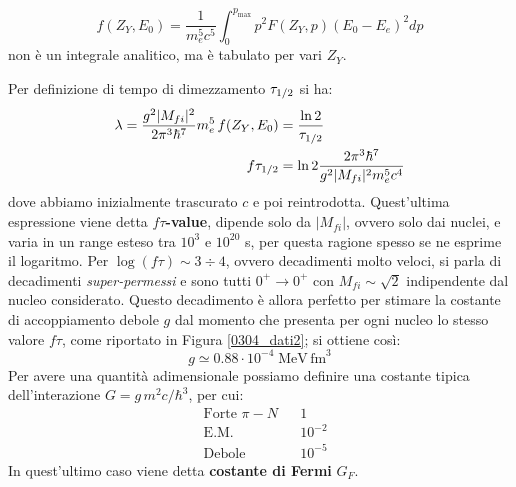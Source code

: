 \begin{definition}
$$f(Z_Y,E_0) = \frac{1}{m_e^5 c^5}\int_0^{p_{\max{}}} p^2 F(Z_Y,p)(E_0-E_e)^2 dp$$
non è un integrale analitico, ma è tabulato per vari $Z_Y$.
\end{definition}
\noindent Per definizione di tempo di dimezzamento $\tau_{1/2}$ si ha:
\begin{displaymath}
\begin{aligned}
\lambda = \frac{g^2 |M_{fi}|^2}{2\pi^3 \hbar^7} m_e^5\, f(Z_Y,E_0) &= \frac{\ln{2}}{\tau_{1/2}} \\
f\tau_{1/2} &= \ln{2}\frac{2\pi^3 \hbar^7}{ g^2 |M_{fi}|^2 m_e^5 c^4} 
\end{aligned}
\end{displaymath}
dove abbiamo inizialmente trascurato $c$ e poi reintrodotta. Quest'ultima espressione viene detta $f\tau$\textbf{-value}, dipende solo da $|M_{fi}|$, ovvero solo dai nuclei, e varia in un range esteso tra $10^3$ e $10^{20}$ s, per questa ragione spesso se ne esprime il logaritmo. Per $\log{(f\tau)}\sim 3 \div 4$, ovvero decadimenti molto veloci, si parla di decadimenti \textit{super-permessi} e sono tutti $0^+\to0^+$ con $M_{fi}\sim \sqrt{2}$ indipendente dal nucleo considerato. Questo decadimento è allora perfetto per stimare la costante di accoppiamento debole $g$ dal momento che presenta per ogni nucleo lo stesso valore $f\tau$, come riportato in Figura \ref{0304_dati2}; si ottiene così:
$$g\simeq 0.88\cdot 10^{-4} \;\mbox{MeV}\,\mbox{fm}^3$$
Per avere una quantità adimensionale possiamo definire una costante tipica dell'interazione $G = g \,m^2c/\hbar^3$, per cui:
\begin{displaymath}
\begin{aligned}
&\text{Forte } \pi-N & &1 \\
&\text{E.M. } & &10^{-2} \\
&\text{Debole } & &10^{-5} 
\end{aligned}
\end{displaymath}
In quest'ultimo caso viene detta \textbf{costante di Fermi} $G_F$.

